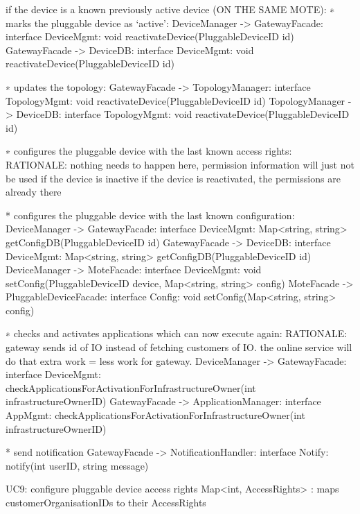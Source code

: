             if the device is a known previously active device (ON THE SAME MOTE):
                ∗ marks the pluggable device as ‘active’:
                    DeviceManager -> GatewayFacade: interface DeviceMgmt: void reactivateDevice(PluggableDeviceID id)
                    GatewayFacade -> DeviceDB:      interface DeviceMgmt: void reactivateDevice(PluggableDeviceID id)

                ∗ updates the topology:
                    GatewayFacade -> TopologyManager: interface TopologyMgmt: void reactivateDevice(PluggableDeviceID id)
                    TopologyManager -> DeviceDB:      interface TopologyMgmt: void reactivateDevice(PluggableDeviceID id)

                ∗ configures the pluggable device with the last known access rights:
                    RATIONALE: nothing needs to happen here, permission information will just not be used if the device is inactive
                               if the device is reactivated, the permissions are already there

                * configures the pluggable device with the last known configuration:
                    DeviceManager -> GatewayFacade:      interface DeviceMgmt: Map<string, string> getConfigDB(PluggableDeviceID id)
                    GatewayFacade -> DeviceDB:           interface DeviceMgmt: Map<string, string> getConfigDB(PluggableDeviceID id)
                    DeviceManager -> MoteFacade:         interface DeviceMgmt: void setConfig(PluggableDeviceID device, Map<string, string> config)
                    MoteFacade -> PluggableDeviceFacade: interface Config:     void setConfig(Map<string, string> config)

                ∗ checks and activates applications which can now execute again:
                    RATIONALE: gateway sends id of IO instead of fetching customers of IO. the online service will do that extra work = less work for gateway.
                    DeviceManager -> GatewayFacade:      interface DeviceMgmt: checkApplicationsForActivationForInfrastructureOwner(int infrastructureOwnerID)
                    GatewayFacade -> ApplicationManager: interface AppMgmt: checkApplicationsForActivationForInfrastructureOwner(int infrastructureOwnerID)

                * send notification
                    GatewayFacade -> NotificationHandler: interface Notify:       notify(int userID, string message)

        UC9: configure pluggable device access rights
            Map<int, AccessRights> : maps customerOrganisationIDs to their AccessRights

